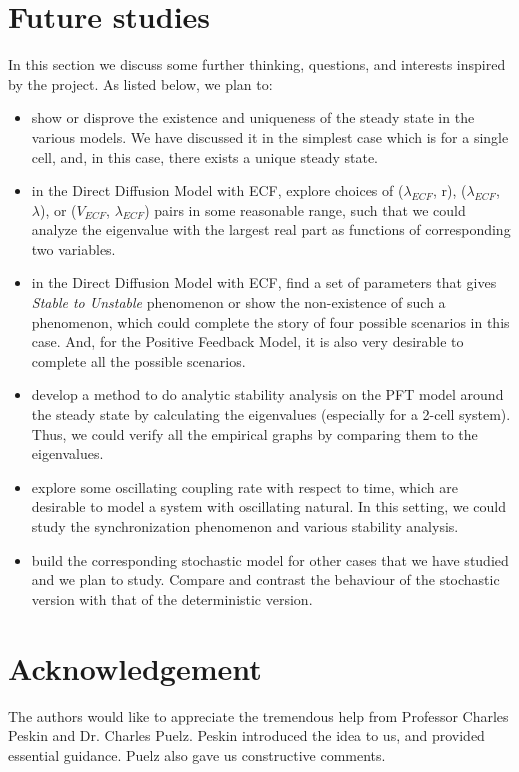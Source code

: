 \documentclass[12pt]{article}
\renewcommand{\(}{\left (}
\renewcommand{\)}{\right )}
\begin{document}
\newpage

\section{Future studies}
\hspace{5mm} In this section we discuss some further thinking, questions, and interests inspired by the project. As listed below, we plan to:

\begin{itemize}
    \item show or disprove the existence and uniqueness of the steady state in the various models. We have discussed it in the simplest case which is for a single cell, and, in this case, there exists a unique steady state.
    \item in the Direct Diffusion Model with ECF, explore choices of ($\lambda_{ECF}$, r), ($\lambda_{ECF}$, $\lambda$), or ($V_{ECF}$, $\lambda_{ECF}$) pairs in some reasonable range, such that we could analyze the eigenvalue with the largest real part as functions of corresponding two variables.
    \item in the Direct Diffusion Model with ECF, find a set of parameters that gives \textit{Stable to Unstable} phenomenon or show the non-existence of such a phenomenon, which could complete the story of four possible scenarios in this case. And, for the Positive Feedback Model, it is also very desirable to complete all the possible scenarios.
    \item develop a method to do analytic stability analysis on the PFT model around the steady state by calculating the eigenvalues (especially for a 2-cell system). Thus, we could verify all the empirical graphs by comparing them to the eigenvalues.
    \item explore some oscillating coupling rate with respect to time, which are desirable to model a system with oscillating natural. In this setting, we could study the synchronization phenomenon and various stability analysis.
    \item build the corresponding stochastic model for other cases that we have studied and we plan to study. Compare and contrast the behaviour of the stochastic version with that of the deterministic version.
\end{itemize}

\section{Acknowledgement}
\hspace{5mm} The authors would like to appreciate the tremendous help from Professor Charles Peskin and Dr. Charles Puelz. Peskin introduced the idea to us, and provided essential guidance. Puelz also gave us constructive comments.
\end{document}
